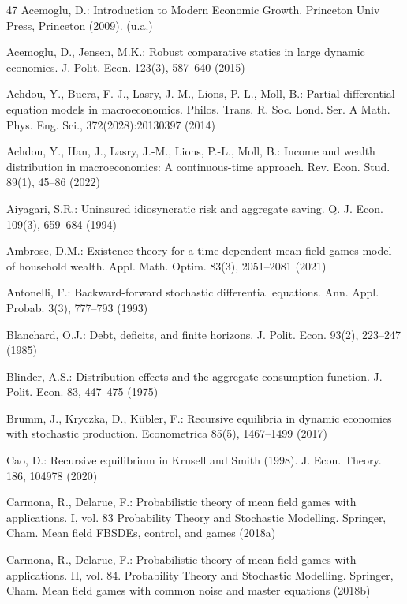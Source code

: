 \documentclass[11pt,oneside,english,reqno,dvipsnames,table]{amsart}
\numberwithin{equation}{section}
\theoremstyle{plain}
\theoremstyle{definition}
\theoremstyle{remark}
\theoremstyle{plain}
\theoremstyle{plain}
\theoremstyle{plain}
\theoremstyle{plain}
\theoremstyle{plain}
\theoremstyle{plain}
\theoremstyle{plain}
\numberwithin{thm}{section}
\begin{document}
\begin{thebibliography}{47}
Acemoglu, D.: Introduction to Modern Economic Growth. Princeton Univ Press, Princeton (2009). (u.a.)

Acemoglu, D., Jensen, M.K.: Robust comparative statics in large dynamic economies. J. Polit. Econ. 123(3), 587--640 (2015)

Achdou, Y., Buera, F. J., Lasry, J.-M., Lions, P.-L., Moll, B.: Partial differential equation models in macroeconomics. Philos. Trans. R. Soc. Lond. Ser. A Math. Phys. Eng. Sci., 372(2028):20130397 (2014)

Achdou, Y., Han, J., Lasry, J.-M., Lions, P.-L., Moll, B.: Income and wealth distribution in macroeconomics: A continuous-time approach. Rev. Econ. Stud. 89(1), 45--86 (2022)

Aiyagari, S.R.: Uninsured idiosyncratic risk and aggregate saving. Q. J. Econ. 109(3), 659--684 (1994)

Ambrose, D.M.: Existence theory for a time-dependent mean field games model of household wealth. Appl. Math. Optim. 83(3), 2051--2081 (2021)

Antonelli, F.: Backward-forward stochastic differential equations. Ann. Appl. Probab. 3(3), 777--793 (1993)

Blanchard, O.J.: Debt, deficits, and finite horizons. J. Polit. Econ. 93(2), 223--247 (1985)

Blinder, A.S.: Distribution effects and the aggregate consumption function. J. Polit. Econ. 83, 447--475 (1975)

Brumm, J., Kryczka, D., K\"ubler, F.: Recursive equilibria in dynamic economies with stochastic production. Econometrica 85(5), 1467--1499 (2017)

Cao, D.: Recursive equilibrium in Krusell and Smith (1998). J. Econ. Theory. 186, 104978 (2020)

Carmona, R., Delarue, F.: Probabilistic theory of mean field games with applications. I, vol. 83 Probability Theory and Stochastic Modelling. Springer, Cham. Mean field FBSDEs, control, and games (2018a)

Carmona, R., Delarue, F.: Probabilistic theory of mean field games with applications. II, vol. 84. Probability Theory and Stochastic Modelling. Springer, Cham. Mean field games with common noise and master equations (2018b)


\end{thebibliography}
\end{document}

